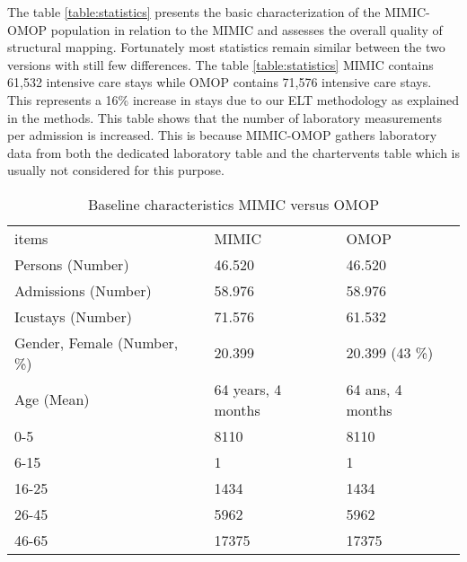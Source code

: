 The table \ref{table:statistics} presents the basic characterization of the 
MIMIC-OMOP population in relation to the MIMIC and assesses the overall quality of 
structural mapping.
Fortunately most statistics remain similar between the two versions with still
few differences. The table \ref{table:statistics} MIMIC contains 61,532
intensive care stays while OMOP contains 71,576 intensive care stays. This
represents a 16\% increase in stays due to our ELT methodology as explained in
the methods. This table shows that the number of laboratory measurements per
admission is increased. This is because MIMIC-OMOP gathers laboratory data from
both the dedicated laboratory table and the chartervents table which is usually
not considered for this purpose.

\begin{table*}[t]
\caption{Baseline characteristics MIMIC versus OMOP}
\begin{tabular}{@{}lll@{}}\toprule
items                                  & MIMIC                       & OMOP                               \\\colrule
Persons (Number)                       & 46.520                      & 46.520                             \\
Admissions (Number)                    & 58.976                      & 58.976                             \\
Icustays (Number)                      & 71.576                      & 61.532                             \\
Gender, Female (Number, \%)            & 20.399                      & 20.399 (43 \%)                     \\
Age (Mean)                             & 64 years, 4 months          & 64 ans, 4 months                   \\
0-5                                    & 8110                        & 8110                               \\
6-15                                   & 1                           & 1                                  \\
16-25                                  & 1434                        & 1434                               \\
26-45                                  & 5962                        & 5962                               \\
46-65                                  & 17375                       & 17375                              \\

\end{tabular}
\end{table*}
